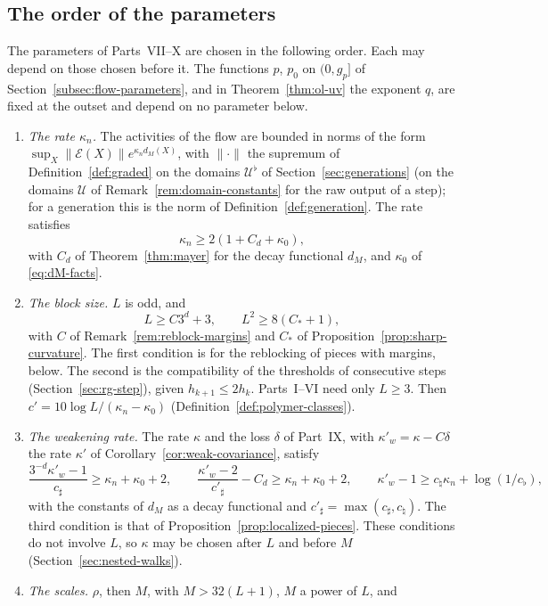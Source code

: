 \subsection{The order of the parameters}\label{subsec:flow-order}

\begin{remark}[Parameters]\label{rem:parameters}
The parameters of Parts~VII--X are chosen in the following order. Each may depend on those chosen before it. The functions $p$, $p_0$ on $(0,g_p]$ of Section~\ref{subsec:flow-parameters}, and in Theorem~\ref{thm:ol-uv} the exponent $q$, are fixed at the outset and depend on no parameter below.
\begin{enumerate}[label=(\arabic*)]
\item \emph{The rate $\kappa_n$.} The activities of the flow are bounded in norms of the form $\sup_X\|\mathcal E(X)\|e^{\kappa_nd_M(X)}$, with $\|\cdot\|$ the supremum of Definition~\ref{def:graded} on the domains $\mathcal U^\flat$ of Section~\ref{sec:generations} (on the domains $\mathcal U$ of Remark~\ref{rem:domain-constants} for the raw output of a step); for a generation this is the norm of Definition~\ref{def:generation}. The rate satisfies
\[
\kappa_n\ge2(1+C_d+\kappa_0),
\]
with $C_d$ of Theorem~\ref{thm:mayer} for the decay functional $d_M$, and $\kappa_0$ of \eqref{eq:dM-facts}.
\item \emph{The block size.} $L$ is odd, and
\[
L\ge C3^d+3,\qquad L^2\ge8(C_*+1),
\]
with $C$ of Remark~\ref{rem:reblock-margins} and $C_*$ of Proposition~\ref{prop:sharp-curvature}. The first condition is for the reblocking of pieces with margins, below. The second is the compatibility of the thresholds of consecutive steps (Section~\ref{sec:rg-step}), given $h_{k+1}\le2h_k$. Parts~I--VI need only $L\ge3$. Then $c'=10\log L/(\kappa_n-\kappa_0)$ (Definition~\ref{def:polymer-classes}).
\item \emph{The weakening rate.} The rate $\kappa$ and the loss $\delta$ of Part~IX, with $\kappa'_w=\kappa-C\delta$ the rate $\kappa'$ of Corollary~\ref{cor:weak-covariance}, satisfy
\[
\frac{3^{-d}\kappa'_w-1}{c_\sharp}\ge\kappa_n+\kappa_0+2,\qquad\frac{\kappa'_w-2}{c'_\sharp}-C_d\ge\kappa_n+\kappa_0+2,\qquad\kappa'_w-1\ge c_\natural\kappa_n+\log(1/c_\flat),
\]
with the constants of $d_M$ as a decay functional and $c'_\sharp=\max(c_\sharp,c_\natural)$. The third condition is that of Proposition~\ref{prop:localized-pieces}. These conditions do not involve $L$, so $\kappa$ may be chosen after $L$ and before $M$ (Section~\ref{sec:nested-walks}).
\item \emph{The scales.} $\rho$, then $M$, with $M>32(L+1)$, $M$ a power of $L$, and

\end{enumerate}
\end{remark}
